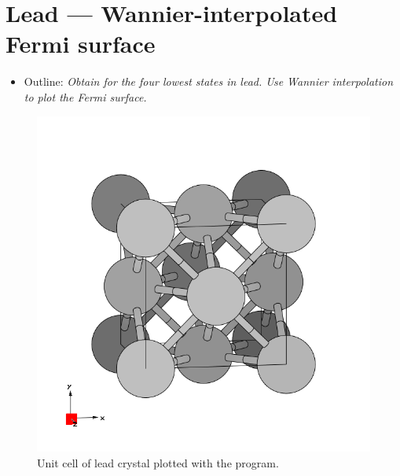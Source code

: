 \section{Lead --- Wannier-interpolated Fermi surface}
\label{sec2:lead}
\begin{itemize}
\item Outline: {\it Obtain \MLWFs{} for the four lowest states in lead. Use Wannier interpolation to plot the
Fermi surface.}
\end{itemize}

\begin{figure}[h!]
\centering
\includegraphics[width=0.25\columnwidth,trim={45pt 45pt 55pt 55pt},clip]{figure/example02/lead.png}
\caption{Unit cell of lead crystal plotted with the \xcrysden{} program.}
\label{fig2.0}
\end{figure}

